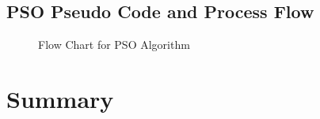 \subsection{PSO Pseudo Code and Process Flow}
\begin{figure}[htbp!]
	\begin{center}
	\caption{Flow Chart for PSO Algorithm}
	\label{fig:PSOAlgorithmFlowChart}
	\end{center}
\end{figure}

\section{Summary}
